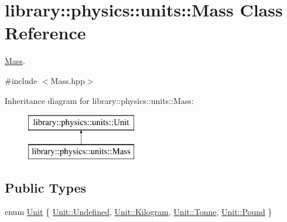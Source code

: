 \hypertarget{classlibrary_1_1physics_1_1units_1_1_mass}{}\section{library\+:\+:physics\+:\+:units\+:\+:Mass Class Reference}
\label{classlibrary_1_1physics_1_1units_1_1_mass}


\hyperlink{classlibrary_1_1physics_1_1units_1_1_mass}{Mass}.  




{\ttfamily \#include $<$Mass.\+hpp$>$}

Inheritance diagram for library\+:\+:physics\+:\+:units\+:\+:Mass\+:\begin{figure}[H]
\begin{center}
\leavevmode
\includegraphics[height=2.000000cm]{classlibrary_1_1physics_1_1units_1_1_mass}
\end{center}
\end{figure}
\subsection*{Public Types}
\begin{DoxyCompactItemize}
\item 
enum \hyperlink{classlibrary_1_1physics_1_1units_1_1_mass_a95f1e0434bc16794926b8e273bc2a54b}{Unit} \{ \hyperlink{classlibrary_1_1physics_1_1units_1_1_mass_a95f1e0434bc16794926b8e273bc2a54baec0fc0100c4fc1ce4eea230c3dc10360}{Unit\+::\+Undefined}, 
\hyperlink{classlibrary_1_1physics_1_1units_1_1_mass_a95f1e0434bc16794926b8e273bc2a54ba9d71f8d145c74f11bf9b02047645bcf4}{Unit\+::\+Kilogram}, 
\hyperlink{classlibrary_1_1physics_1_1units_1_1_mass_a95f1e0434bc16794926b8e273bc2a54ba8cc4e66809c94072df6426c278d7b36b}{Unit\+::\+Tonne}, 
\hyperlink{classlibrary_1_1physics_1_1units_1_1_mass_a95f1e0434bc16794926b8e273bc2a54ba5a9dc6d94a5d29cbb1b5bc104fa23730}{Unit\+::\+Pound}
 \}
\end{DoxyCompactItemize}

